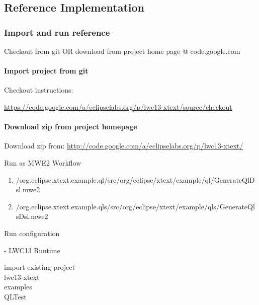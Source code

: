 \subsection{Reference Implementation}
\label{subsec:referenceImpl}





\subsubsection{Import and run reference}

Checkout from git OR download from project home page @ code.google.com

\paragraph{Import project from git}

Checkout instructions:

\url{https://code.google.com/a/eclipselabs.org/p/lwc13-xtext/source/checkout}

\paragraph{Download zip from project homepage}

Download zip from:
\url{http://code.google.com/a/eclipselabs.org/p/lwc13-xtext/}

Run as MWE2 Workflow
\begin{enumerate}
\item
/org.eclipse.xtext.example.ql/src/org/eclipse/xtext/example/ql/GenerateQlDsl.mwe2

\item
/org.eclipse.xtext.example.qls/src/org/eclipse/xtext/example/qls/GenerateQlsDsl.mwe2
\end{enumerate}

Run configuration

- LWC13 Runtime

import existing project
- \\lwc13-xtext\\examples\\QLTest



